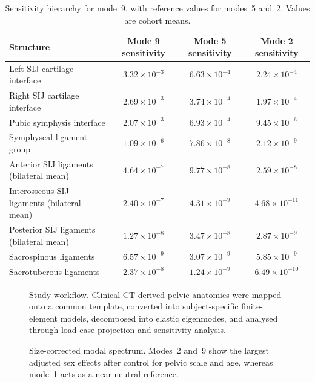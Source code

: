 \documentclass[openacc]{rsproca_new}
\begin{document}
\begin{table}[p]
\centering
\caption{Sensitivity hierarchy for mode~9, with reference values for modes~5 and~2. Values are cohort means.}
\label{tab:sensitivity}
\begin{tabular}{lccc}
\toprule
Structure & Mode 9 sensitivity & Mode 5 sensitivity & Mode 2 sensitivity \\
\midrule
Left SIJ cartilage interface & $3.32 \times 10^{-3}$ & $6.63 \times 10^{-4}$ & $2.24 \times 10^{-4}$ \\
Right SIJ cartilage interface & $2.69 \times 10^{-3}$ & $3.74 \times 10^{-4}$ & $1.97 \times 10^{-4}$ \\
Pubic symphysis interface & $2.07 \times 10^{-3}$ & $6.93 \times 10^{-4}$ & $9.45 \times 10^{-6}$ \\
Symphyseal ligament group & $1.09 \times 10^{-6}$ & $7.86 \times 10^{-8}$ & $2.12 \times 10^{-9}$ \\
Anterior SIJ ligaments (bilateral mean) & $4.64 \times 10^{-7}$ & $9.77 \times 10^{-8}$ & $2.59 \times 10^{-8}$ \\
Interosseous SIJ ligaments (bilateral mean) & $2.40 \times 10^{-7}$ & $4.31 \times 10^{-9}$ & $4.68 \times 10^{-11}$ \\
Posterior SIJ ligaments (bilateral mean) & $1.27 \times 10^{-8}$ & $3.47 \times 10^{-8}$ & $2.87 \times 10^{-9}$ \\
Sacrospinous ligaments & $6.57 \times 10^{-9}$ & $3.07 \times 10^{-9}$ & $5.85 \times 10^{-9}$ \\
Sacrotuberous ligaments & $2.37 \times 10^{-8}$ & $1.24 \times 10^{-9}$ & $6.49 \times 10^{-10}$ \\
\bottomrule
\end{tabular}
\end{table}

\begin{figure}[p]
\centering
{}
\caption{Study workflow. Clinical CT-derived pelvic anatomies were mapped onto a common template, converted into subject-specific finite-element models, decomposed into elastic eigenmodes, and analysed through load-case projection and sensitivity analysis.}
\label{fig:workflow}
\end{figure}

\begin{figure}[p]
\centering
{}
\caption{Size-corrected modal spectrum. Modes~2 and~9 show the largest adjusted sex effects after control for pelvic scale and age, whereas mode~1 acts as a near-neutral reference.}
\label{fig:eigs}
\end{figure}
\end{document}
